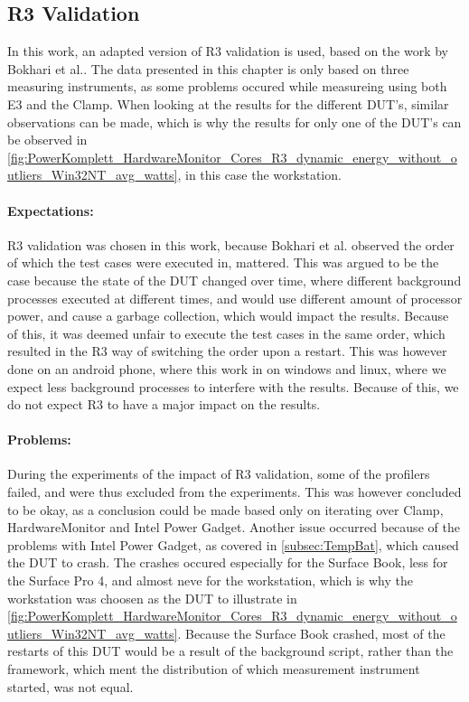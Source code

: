 \subsection{R3 Validation}

In this work, an adapted version of R3 validation is used, based on the work by Bokhari et al.\cite[]{Bokhari2020r3}. The data presented in this chapter is only based on three measuring instruments, as some problems occured while measureing using both E3 and the Clamp. When looking at the results for the different DUT's, similar observations can be made, which is why the results for only one of the DUT's can be observed in \cref{fig:PowerKomplett_HardwareMonitor_Cores_R3_dynamic_energy_without_outliers_Win32NT_avg_watts}, in this case the workstation. 




\paragraph{Expectations:} R3 validation was chosen in this work, because Bokhari et al.\cite[]{Bokhari2020r3} observed the order of which the test cases were executed in, mattered. This was argued to be the case because the state of the DUT changed over time, where different background processes executed at different times, and would use different amount of processor power, and cause a garbage collection, which would impact the results. Because of this, it was deemed unfair to execute the test cases in the same order, which resulted in the R3 way of switching the order upon a restart. This was however done on an android phone, where this work in on windows and linux, where we expect less background processes to interfere with the results. Because of this, we do not expect R3 to have a major impact on the results.

\paragraph{Problems:} During the experiments of the impact of R3 validation, some of the profilers failed, and were thus excluded from the experiments. This was however concluded to be okay, as a conclusion could be made based only on iterating over Clamp, HardwareMonitor and Intel Power Gadget. Another issue occurred because of the problems with Intel Power Gadget, as covered in \cref{subsec:TempBat}, which caused the DUT to crash. The crashes occured especially for the Surface Book, less for the Surface Pro 4, and almost neve for the workstation, which is why the workstation was choosen as the DUT to illustrate in \cref{fig:PowerKomplett_HardwareMonitor_Cores_R3_dynamic_energy_without_outliers_Win32NT_avg_watts}. Because the Surface Book crashed, most of the restarts of this DUT would be a result of the background script, rather than the framework, which ment the distribution of which measurement instrument started, was not equal.

